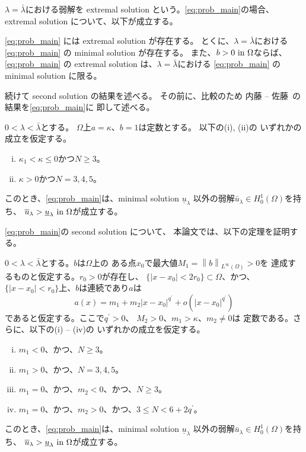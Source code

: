 $\lambda = \bar{\lambda}$における弱解を
extremal solution という。\ref{eq:prob_main}の場合、
extremal solution について、以下が成立する。

\begin{thm} \label{thm:extremal_solution}
 \ref{eq:prob_main} には extremal solution が存在する。
 とくに、$\lambda = \bar{\lambda}$における
 \ref{eq:prob_main} の
 minimal solution が存在する。
 また、$b > 0 ~\text{in}~ \Omega$ならば、\ref{eq:prob_main} の 
 extremal solution は、$\lambda = \bar{\lambda}$における
 \ref{eq:prob_main} の
 minimal solution に限る。
\end{thm}

続けて second solution の結果を述べる。
その前に、比較のため
内藤 -- 佐藤~\cite{MR2886160}の結果を\ref{eq:prob_main}に
即して述べる。

\begin{thm}
 \label{thm:second_solution_naito_sato}
 $0 < \lambda < \bar{\lambda}$とする。
 $\Omega$上$a = \kappa$、$b = 1$は定数とする。
 以下の(i), (ii)の
 いずれかの成立を仮定する。
 \begin{enumerate}[(i)]
  \item $\kappa_1 < \kappa \leq 0$かつ$N \geq 3$。
  \item $\kappa > 0$かつ$N = 3, 4, 5$。
 \end{enumerate}
 このとき、\ref{eq:prob_main}は、minimal solution
 $\underline{u}_\lambda$
 以外の弱解$\bar{u}_\lambda \in H_0^1(\Omega)$を持ち、
 $\overline{u}_\lambda >
 \underline{u}_\lambda ~\text{in}~ \Omega$が成立する。
\end{thm}

\ref{eq:prob_main}の second solution について、
本論文では、以下の定理を証明する。

\begin{thm} \label{thm:second_solution}
 $0 < \lambda < \bar{\lambda}$とする。$b$は$\Omega$上の
 ある点$x_0$で最大値$M_1 = \left\| b \right\|_{L^\infty(\Omega)} > 0$を
 達成するものと仮定する。$r_0 > 0$が存在し、
 $\{ \lvert x - x_0 \rvert < 2r_0 \} \subset \Omega$、かつ、
 $\{ \lvert x - x_0 \rvert < r_0 \}$上、$b$は連続であり$a$は
 \begin{equation}
  a(x) = m_1 + m_2 \lvert x-x_0 \rvert^{q^\prime} 
  + o(\lvert x-x_0 \rvert^{q^\prime}) \label{eq:a_q}
 \end{equation}
 であると仮定する。ここで$q^\prime > 0$、
 $M_2 > 0$、$m_1 > \kappa$、$m_2 \neq 0$は
 定数である。さらに、以下の(i) -- (iv)の
 いずれかの成立を仮定する。
 \begin{enumerate}[(i)]
  \item $m_1 < 0$、かつ、$N \geq 3$。
  \item $m_1 > 0$、かつ、$N = 3, 4, 5$。
  \item $m_1 = 0$、かつ、$m_2 < 0$、かつ、$N \geq 3$。
  \item $m_1 = 0$、かつ、$m_2 > 0$、かつ、$3 \leq N < 6 + 2q^\prime$。
 \end{enumerate}
 このとき、\ref{eq:prob_main}は、minimal solution
 $\underline{u}_\lambda$
 以外の弱解$\bar{u}_\lambda \in H_0^1(\Omega)$を持ち、
 $\overline{u}_\lambda >
 \underline{u}_\lambda ~\text{in}~ \Omega$が成立する。
\end{thm}

